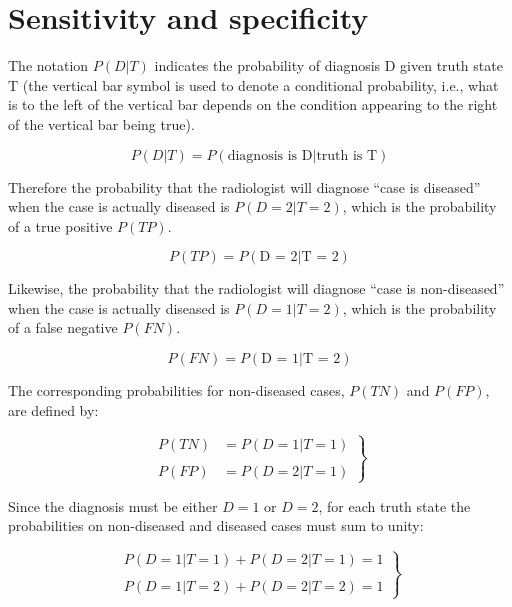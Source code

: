 \documentclass[
]{book}
\begin{document}
\hypertarget{sensitivity-and-specificity}{%
\section{Sensitivity and specificity}\label{sensitivity-and-specificity}}

The notation \(P(D|T)\) indicates the probability of diagnosis D given truth state T (the vertical bar symbol is used to denote a conditional probability, i.e., what is to the left of the vertical bar depends on the condition appearing to the right of the vertical bar being true).

\begin{equation} 
P(D|T) = P(\text{diagnosis is D} | \text{truth is T})
\label{eq:binaryTask0PDGivenT}
\end{equation}

Therefore the probability that the radiologist will diagnose ``case is diseased'' when the case is actually diseased is \(P(D=2|T=2)\), which is the probability of a true positive \(P(TP)\).

\begin{equation} 
P(TP) = P(\text{D = 2} | \text{T = 2})
\label{eq:binaryTask0PTP}
\end{equation}

Likewise, the probability that the radiologist will diagnose ``case is non-diseased'' when the case is actually diseased is \(P(D=1|T=2)\), which is the probability of a false negative \(P(FN)\).

\begin{equation} 
P(FN) = P(\text{D = 1} | \text{T = 2})
\label{eq:binaryTask0PFN}
\end{equation}

The corresponding probabilities for non-diseased cases, \(P(TN)\) and \(P(FP)\), are defined by:

\begin{equation} 
\left.\begin{aligned}
P(TN)&=P(D=1|T=1)\\ 
\\
P(FP)&=P(D=2|T=1)
\end{aligned}\right\}
\label{eq:binaryTask0PTNFP}
\end{equation}

Since the diagnosis must be either \(D=1\) or \(D=2\), for each truth state the probabilities on non-diseased and diseased cases must sum to unity:

\begin{equation} 
\left.\begin{matrix}
P(D=1|T=1)+P(D=2|T=1)=1\\ 
\\  
P(D=1|T=2)+P(D=2|T=2)=1
\end{matrix}\right\}
\label{eq:binaryTask0PSumsToUnity}
\end{equation}
\end{document}
